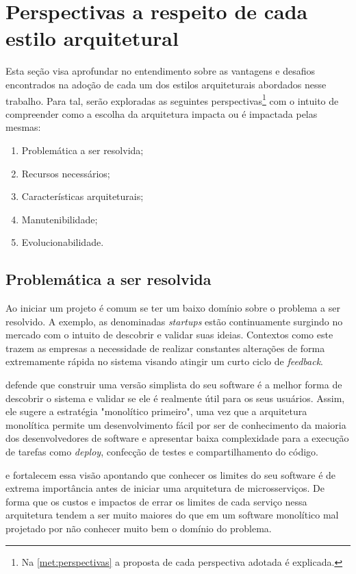 \section{Perspectivas a respeito de cada estilo arquitetural}
\label{perspectivas}

Esta seção visa aprofundar no entendimento sobre as vantagens e desafios encontrados na adoção
de cada um dos estilos arquiteturais abordados nesse trabalho. Para tal, serão exploradas as seguintes
perspectivas\footnote{Na \autoref{met:perspectivas} a proposta de cada perspectiva adotada é explicada.}
com o intuito de compreender como a escolha da arquitetura impacta ou é impactada pelas
mesmas:

\begin{enumerate}
    \item Problemática a ser resolvida;
    \item Recursos necessários;
    \item Características arquiteturais;
    \item Manutenibilidade;
    \item Evolucionabilidade.
\end{enumerate}

\subsection{Problemática a ser resolvida}
\label{Perspectivas:Problematica}

Ao iniciar um projeto é comum se ter um baixo domínio sobre o problema a ser resolvido. A exemplo,
as denominadas \textit{startups} estão continuamente surgindo no mercado com o intuito de descobrir
e validar suas ideias. Contextos como este trazem as empresas a necessidade de realizar constantes
alterações de forma extremamente rápida no sistema visando atingir um curto ciclo de
\textit{feedback}.

 defende que construir uma versão simplista do seu software é
a melhor forma de descobrir o sistema e validar se ele é realmente útil para os seus usuários.
Assim, ele sugere a estratégia "monolítico primeiro", uma vez que a arquitetura monolítica permite
um desenvolvimento fácil por ser de conhecimento da maioria dos desenvolvedores de software e
apresentar baixa complexidade para a execução de tarefas como \textit{deploy}, confecção de testes
e compartilhamento do código.

 e  fortalecem essa visão apontando
que conhecer os limites do seu software é de extrema importância antes de iniciar uma arquitetura de
microsserviços. De forma que os custos e impactos de errar os limites de cada serviço nessa arquitetura
tendem a ser muito maiores do que em um software monolítico mal projetado por não conhecer muito bem o
domínio do problema. 

